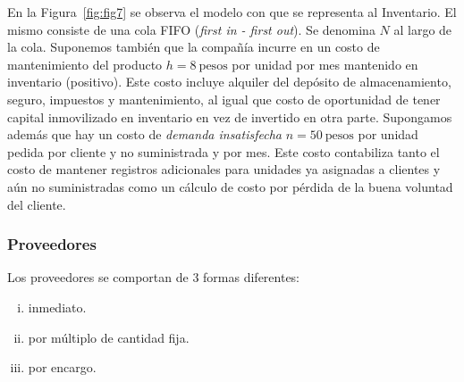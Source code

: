 \documentclass[10pt]{article}
\begin{document}
En la Figura~\ref{fig:fig7} se observa el modelo con que se representa al Inventario. El mismo consiste de una cola FIFO (\textit{first in - first out}). Se denomina $N$ al largo de la cola.
Suponemos también que la compañía incurre en un costo de mantenimiento del producto $h = 8~\textrm{pesos}$ por unidad por mes mantenido en inventario (positivo). Este costo incluye alquiler del depósito de almacenamiento, seguro, impuestos y mantenimiento, al igual que costo de oportunidad de tener capital inmovilizado en inventario en vez de invertido en otra parte. Supongamos además que hay un costo de \textit{demanda insatisfecha} $n = 50~\textrm{pesos}$ por unidad pedida por cliente y no suministrada y por mes. Este costo contabiliza tanto el costo de mantener registros adicionales para unidades ya asignadas a clientes y aún no suministradas como un cálculo de costo por pérdida de la buena voluntad del cliente.
\FloatBarrier

\subsubsection{Proveedores}

Los proveedores se comportan de 3 formas diferentes: 
\begin{enumerate}[i)]
\item inmediato.
\item por múltiplo de cantidad fija.
\item por encargo.
\end{enumerate}
\end{document}
